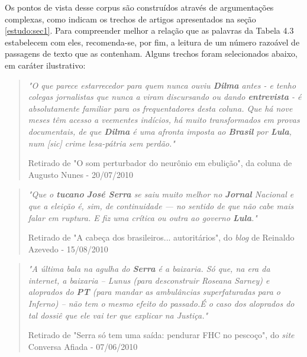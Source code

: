 
Os pontos de vista desse corpus são construídos através de argumentações complexas, como indicam os trechos de artigos apresentados na seção \ref{estudo:sec1}. Para compreender melhor a relação que as palavras da Tabela 4.3 estabelecem com eles, recomenda-se, por fim, a leitura de um número razoável de passagens de texto que as contenham. Alguns trechos foram selecionados abaixo, em caráter ilustrativo:

\begin{quote}
\emph{"O que parece estarrecedor para quem nunca ouviu \textbf{Dilma} antes - e tenho colegas jornalistas que nunca a viram discursando ou dando \textbf{entrevista} - é absolutamente familiar para os frequentadores desta coluna. Que há nove meses têm acesso a veementes indícios, há muito transformados em provas documentais, de que \textbf{Dilma} é uma afronta imposta ao \textbf{Brasil} por \textbf{Lula}, num [sic] crime lesa-pátria sem perdão."}

{\small Retirado de "O som perturbador do neurônio em ebulição", da coluna de Augusto Nunes - 20/07/2010}
\end{quote}

\begin{quote}
\emph{"Que o \textbf{tucano} \textbf{José Serra} se saiu muito melhor no \textbf{Jornal} Nacional e que a eleição é, sim, de continuidade — no sentido de que não cabe mais falar em ruptura. E fiz uma crítica ou outra ao governo \textbf{Lula}."}

{\small Retirado de "A cabeça dos brasileiros... autoritários", do \emph{blog} de Reinaldo Azevedo - 15/08/2010}
\end{quote}

\begin{quote}

\emph{"A última bala na agulha do \textbf{Serra} é a baixaria. Só que, na era da internet, a baixaria – Lunus (para desconstruir Roseana Sarney) e aloprados do \textbf{PT} (para mandar as ambulâncias superfaturadas para o Inferno) – não tem o mesmo efeito do passado.É o caso dos aloprados do tal dossiê que ele vai ter que explicar na Justiça."}

{\small Retirado de "Serra só tem uma saída: pendurar FHC no pescoço", do \emph{site} Conversa Afiada - 07/06/2010}
\end{quote}


